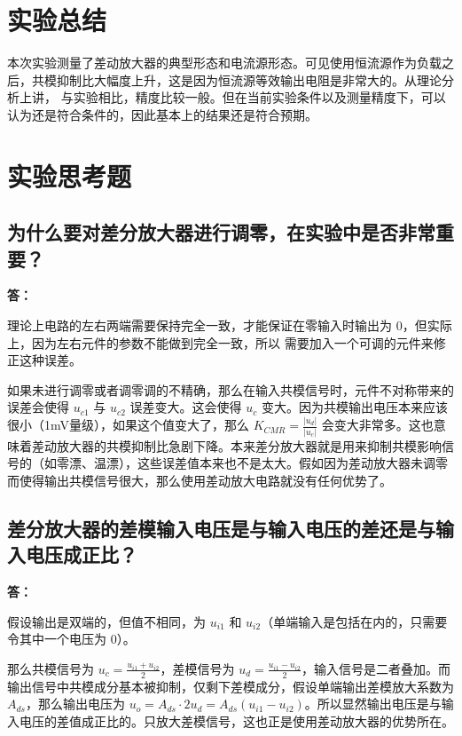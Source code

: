 \documentclass[a4paper,11pt,UTF8]{ctexart}
\newcommand{\p}{\par}
\newcommand{\np}{\par\noindent}
\begin{document}
	\section{实验总结}
	本次实验测量了差动放大器的典型形态和电流源形态。可见使用恒流源作为负载之后，共模抑制比大幅度上升，这是因为恒流源等效输出电阻是非常大的。从理论分析上讲，
	与实验相比，精度比较一般。但在当前实验条件以及测量精度下，可以认为还是符合条件的，因此基本上的结果还是符合预期。
	\section{实验思考题}
	\subsection{为什么要对差分放大器进行调零，在实验中是否非常重要？}
	\np \textbf{答：}
	\p 理论上电路的左右两端需要保持完全一致，才能保证在零输入时输出为 0，但实际上，因为左右元件的参数不能做到完全一致，所以 需要加入一个可调的元件来修正这种误差。
	\p 如果未进行调零或者调零调的不精确，那么在输入共模信号时，元件不对称带来的误差会使得 $u_{c1}$ 与 $u_{c2}$ 误差变大。这会使得 $u_c$ 变大。因为共模输出电压本来应该很小（1mV量级），如果这个值变大了，那么 $K_{CMR}=\frac{|u_d|}{|u_c|}$ 会变大非常多。这也意味着差动放大器的共模抑制比急剧下降。本来差分放大器就是用来抑制共模影响信号的（如零漂、温漂），这些误差值本来也不是太大。假如因为差动放大器未调零而使得输出共模信号很大，那么使用差动放大电路就没有任何优势了。
	
	\subsection{差分放大器的差模输入电压是与输入电压的差还是与输入电压成正比？}
	\np \textbf{答：}
	\p 假设输出是双端的，但值不相同，为 $u_{i1}$ 和 $u_{i2}$（单端输入是包括在内的，只需要令其中一个电压为 0）。
	\p 那么共模信号为 $u_c=\frac{u_{i1}+u_{i2}}{2}$，差模信号为 $u_d=\frac{u_{i1}-u_{i2}}{2}$，输入信号是二者叠加。而输出信号中共模成分基本被抑制，仅剩下差模成分，假设单端输出差模放大系数为 $A_{ds}$，那么输出电压为 $u_o=A_{ds}\cdot 2u_d=A_{ds}(u_{i1}-u_{i2})$。所以显然输出电压是与输入电压的差值成正比的。只放大差模信号，这也正是使用差动放大器的优势所在。
	
	
\end{document}
